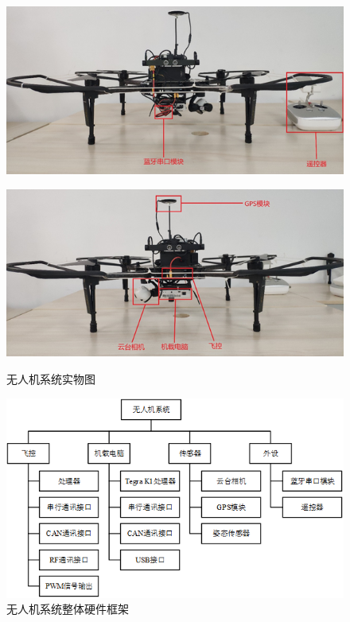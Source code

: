 \clearpage 	
\begin{figure}[htb]
	\centering
	\begin{minipage}[t]{\linewidth} %
		\centering
		\includegraphics[width=\columnwidth]{figures/2-1a.png} 
		\label{fig:2-1a}
	\end{minipage}
	\begin{minipage}[t]{\linewidth} 
		\centering
		\includegraphics[width=\columnwidth]{figures/2-1b.png} 
		\label{fig:2-1b} 
	\end{minipage}
	\caption{无人机系统实物图}
	\label{fig:2-1}
\end{figure}

\clearpage 	
\begin{figure}[htb]
	\centering
	\includegraphics[width=\linewidth]{figures/2-2.png}
	\caption{无人机系统整体硬件框架}
	\label{fig:2-2}
\end{figure}

